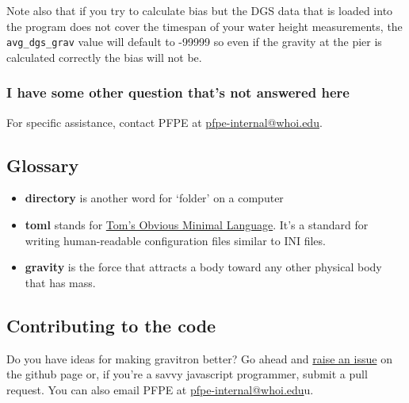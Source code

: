 \documentclass{pfpe-manual}
\begin{document}
Note also that if you try to calculate bias but the DGS data that is loaded into the program does not cover the timespan of your water height measurements, the \texttt{avg\_dgs\_grav} value will default to -99999 so even if the gravity at the pier is calculated correctly the bias will not be.

\subsubsection{I have some other question that's not answered here}
For specific assistance, contact PFPE at \href{mailto:pfpe-internal@whoi.edu}{pfpe-internal@whoi.edu}.

\subsection{Glossary}
\begin{itemize}
\item \textbf{directory} is another word for `folder' on a computer
\item \textbf{toml} stands for \href{https://toml.io/}{Tom's Obvious Minimal Language}. It's a standard for writing human-readable configuration files similar to INI files.
\item \textbf{gravity} is the force that attracts a body toward any other physical body that has mass.
\end{itemize}

\subsection{Contributing to the code}
Do you have ideas for making gravitron better? Go ahead and \href{https://github.com/PFPE/gravitron/issues}{raise an issue} on the github page or, if you're a savvy javascript programmer, submit a pull request. You can also email PFPE at \href{mailto:pfpe-internal@whoi.edu}{pfpe-internal@whoi.edu}u.
\end{document}
